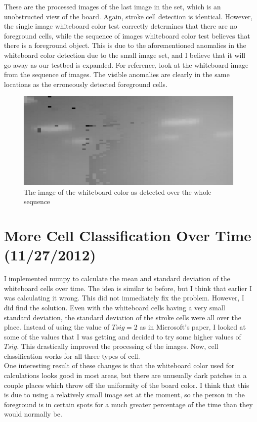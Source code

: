 \documentclass[]{article}
\begin{document}
These are the processed images of the last image in the set, which is an unobstructed view of the board.  Again, stroke cell detection is identical.  However, the single image whiteboard color test correctly determines that there are no foreground cells, while the sequence of images whiteboard color test believes that there is a foreground object.  This is due to the aforementioned anomalies in the whiteboard color detection due to the small image set, and I believe that it will go away as our testbed is expanded.  For reference, look at the whiteboard image from the sequence of images.  The visible anomalies are clearly in the same locations as the erroneously detected foreground cells.

\begin{figure}[H]
\centering
\includegraphics[scale=0.25]{images/background_overtime}
\caption{The image of the whiteboard color as detected over the whole sequence}
\end{figure}	
	\section{More Cell Classification Over Time (11/27/2012)}
		I implemented numpy to calculate the mean and standard deviation of the whiteboard cells over time.  The idea is similar to before, but I think that earlier I was calculating it wrong.  This did not immediately fix the problem.  However, I did find the solution.  Even with the whiteboard cells having a very small standard deviation, the standard deviation of the stroke cells were all over the place.  Instead of using the value of $Tsig = 2$ as in Microsoft's paper, I looked at some of the values that I was getting and decided to try some higher values of $Tsig$.    This drastically improved the processing of the images.  Now, cell classification works for all three types of cell.  \\
		
		One interesting result of these changes is that the whiteboard color used for calculations looks good in most areas, but there are unusually dark patches in a couple places which throw off the uniformity of the board color.  I think that this is due to using a relatively small image set at the moment, so the person in the foreground is in certain spots for a much greater percentage of the time than they would normally be.
\end{document}
